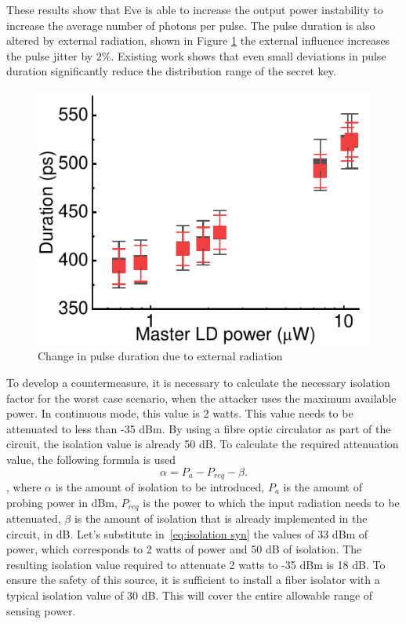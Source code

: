 These results show that Eve is able to increase the output power instability to increase the average number of photons per pulse. The pulse duration is also altered by external radiation, shown in Figure \ref{fig:duration syn} the external influence increases the pulse jitter by $2\%$.  Existing work shows that even small deviations in pulse duration significantly reduce the distribution range of the secret key. 
\begin{figure}
    \centering
    \includegraphics{images/duration_change.pdf}
    \caption{Change in pulse duration due to external radiation}
    \label{fig:duration syn}
\end{figure}
\newline To develop a countermeasure, it is necessary to calculate the necessary isolation factor for the worst case scenario, when the attacker uses the maximum available power. In continuous mode, this value is 2 watts. This value needs to be attenuated to less than -35 dBm. By using a fibre optic circulator as part of the circuit, the isolation value is already 50 dB.  To calculate the required attenuation value, the following formula is used
\begin{equation}
\label{eq:isolation syn}
    \alpha = P_a - P_{req} - \beta.
\end{equation}, where $\alpha$ is the amount of isolation to be introduced, $P_a$ is the amount of probing power in dBm, $P_{req}$ is the power to which the input radiation needs to be attenuated, $\beta$ is the amount of isolation that is already implemented in the circuit, in dB. 
Let's substitute in~\ref{eq:isolation syn} the values of 33 dBm of power, which corresponds to 2 watts of power and 50 dB of isolation. The resulting isolation value required to attenuate 2 watts to -35 dBm is 18 dB. To ensure the safety of this source, it is sufficient to install a fiber isolator with a typical isolation value of 30 dB. This will cover the entire allowable range of sensing power. 
